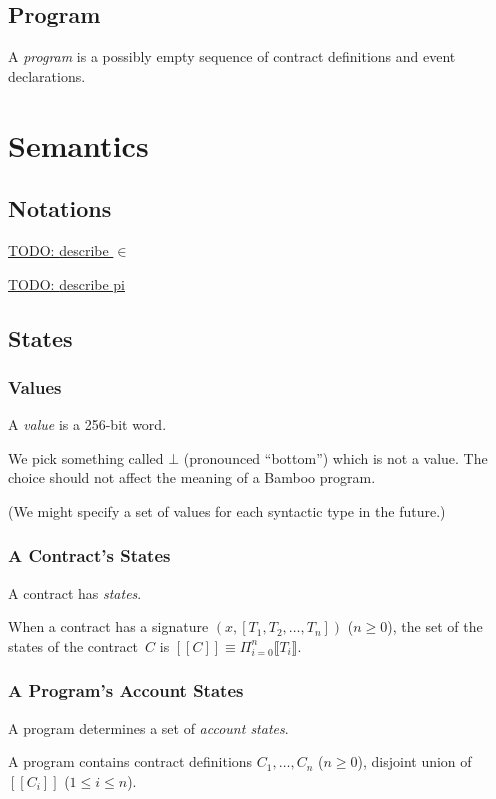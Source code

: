 \documentclass{book}
\newcommand{\todo}[1]{\underline{TODO: {#1}}}
\newcommand{\sem}[1]{\llbracket{#1}\rrbracket}
\begin{document}
\section{Program}

A \textit{program} is a possibly empty sequence of contract definitions and event declarations.

\chapter{Semantics}

\section{Notations}

\todo{describe $\in$}

\todo{describe pi}

\section{States}

\subsection{Values}

A \textit{value} is a 256-bit word.

We pick something called $\bot$ (pronounced ``bottom'') which is not a value.  The choice should not affect the meaning of a Bamboo program.

(We might specify a set of values for each syntactic type in the future.)

\subsection{A Contract's States}
A contract has \textit{states}.

When a contract has a signature $(x, [T_1, T_2, \ldots, T_n])$ ($n \ge 0$),
the set of the states of the contract~$C$ is
$[[C]] \equiv \Pi_{i = 0}^{n} \sem{T_i}$.

\subsection{A Program's Account States}
A program determines a set of \textit{account states}.

A program contains contract definitions $C_1, \ldots, C_n$ ($n \ge 0$),
disjoint union of $[[C_i]]$ ($1 \le i \le n$).
\end{document}

